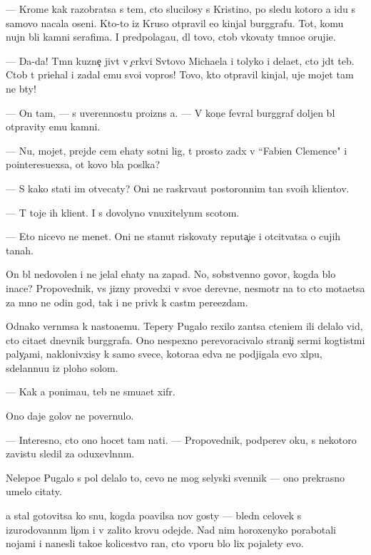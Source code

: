 \documentclass[10pt]{book}
\begin{document}
— Krome kak razobratsa s tem, cto slucilosy s Kristino{\y}, po sledu kotoro{\y} {\y}a idu s samovo nacala oseni. Kto-to iz Kruso otpravil {\y}e{\y}o kinjal burggrafu. Tot, komu nujn{\yi} b{\yi}li kamni serafima. I predpolaga{\y}u, dl{\ia} tovo, ctob{\yi} v{\yi}kovaty t{\e}mno{\y}e oruji{\y}e.

— Da-da! T{\e}mn{\yi}{\y} kuzne{\c} jiv{\e}t v {\c}erkvi Sv{\ia}tovo Michaela i tolyko i dela{\y}et, cto jd{\e}t teb{\ia}. Ctob{\yi} t{\yi} pri{\y}ehal i zadal {\y}emu svo{\y}i vopros{\yi}! Tovo, kto otpravil kinjal, uje mojet tam ne b{\yi}ty!

— On tam, — s uverennost{\y}u proizn{\e}s {\y}a. — V kon{\c}e fevral{\ia} burggraf doljen b{\yi}l otpravity {\y}emu kamni.

— Nu, mojet, prejde cem {\y}ehaty sotni lig, t{\yi} prosto za{\y}d{\e}x v ``Fabien Clemence" i pointeresu{\y}exsa, ot kovo b{\yi}la pos{\yi}lka?

— S kako{\y} stati im otvecaty? Oni ne raskr{\yi}va{\y}ut postoronnim ta{\y}n{\yi} svo{\y}ih kli{\y}entov.

— T{\yi} toje ih kli{\y}ent. I s dovolyno vnuxitelyn{\yi}m scotom.

— Eto nicevo ne men{\ia}{\y}et. Oni ne stanut riskovaty reputa{\c}i{\y}e{\y} i otcit{\yi}vatsa o cujih ta{\y}nah.

On b{\yi}l nedovolen i ne jelal {\y}ehaty na zapad. No, sobstvenno govor{\ia}, kogda b{\yi}lo inace? Propovednik, vs{\iu} jizny provedxi{\y} v svo{\y}e{\y} derevne, nesmotr{\ia} na to cto mota{\y}etsa za mno{\y} ne odin god, tak i ne priv{\yi}k k cast{\yi}m pere{\y}ezdam.

Odnako vern{\e}msa k nasto{\y}a{\x}emu. Tepery Pugalo rexilo zan{\ia}tsa cteni{\y}em ili delalo vid, cto cita{\y}et dnevnik burggrafa. Ono nespexno perevoracivalo strani{\c}i ser{\yi}mi kogtist{\yi}mi paly{\c}ami, naklonivxisy k samo{\y} svece, kotora{\y}a {\y}edva ne podjigala {\y}evo xl{\ia}pu, sdelannu{\y}u iz ploho{\y} solom{\yi}.

— Kak {\y}a ponima{\y}u, teb{\ia} ne smu{\x}a{\y}et xifr.

Ono daje golov{\yi} ne povernulo.

— Interesno, cto ono hocet tam na{\y}ti. — Propovednik, podperev {\x}oku, s nekotoro{\y} zavist{\y}u sledil za oduxevl{\e}nn{\yi}m.

Nelepo{\y}e Pugalo s pol{\ia} delalo to, cevo ne mog selyski{\y} sv{\ia}{\x}ennik — ono prekrasno umelo citaty.

{\Y}a stal gotovitsa ko snu, kogda po{\y}avilsa nov{\yi}{\y} gosty — bledn{\yi}{\y} celovek s izurodovann{\yi}m li{\c}om i v zalito{\y} krov{\y}u odejde. Nad nim horoxenyko porabotali nojami i nanesli tako{\y}e kolicestvo ran, cto vporu b{\yi}lo lix pojalety {\y}evo.
\end{document}
